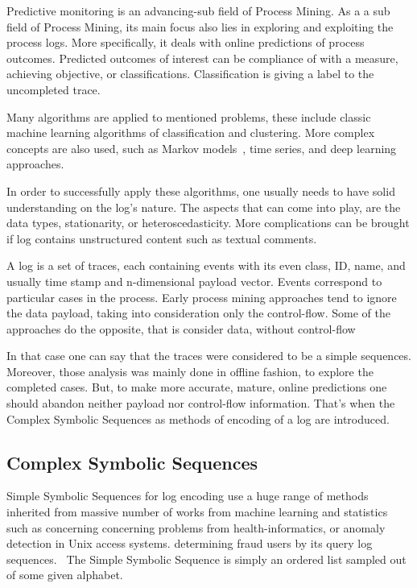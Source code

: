 Predictive monitoring is an advancing-sub field of Process Mining. As a a sub field of Process Mining, its main focus also lies in exploring and exploiting the process logs. More specifically, it deals with online predictions of process outcomes. Predicted outcomes of interest can be compliance of with a measure, achieving objective, or classifications. Classification is giving a label to the uncompleted trace.  
\par
Many algorithms are applied to mentioned problems, these include classic machine learning algorithms of classification and clustering. More complex concepts are also used, such as Markov models~\cite{Leontjeva2015}, time series, and deep learning\cite{niek96732,evermann,quteprints96732} approaches. 
\par
In order to successfully apply these algorithms, one usually needs to have solid understanding on the log's nature. The aspects that can come into play, are the data types, stationarity, or heteroscedasticity. More complications can be brought if log contains unstructured content such as textual comments.
\par
A log is a set of traces, each containing events with its even class, ID, name, and usually time stamp and n-dimensional payload vector. Events correspond to particular cases in the process. Early process mining approaches tend to ignore the data payload, taking into consideration only the control-flow. Some of the approaches do the opposite, that is consider data, without control-flow~\cite{vanderAalst2010,Schonenberg_timeprediction,Schonenberg2008}  
\par
In that case one can say that the traces were considered to be a simple sequences. Moreover, those analysis was mainly done in offline fashion, to explore the completed cases. But, to make more accurate, mature, online predictions one should abandon neither payload nor control-flow information. That's when the Complex Symbolic Sequences as methods of encoding of a log are introduced. 



\subsection{Complex Symbolic Sequences}

Simple Symbolic Sequences for log encoding use a huge range of methods inherited from massive number of works from machine learning and statistics such as concerning concerning problems from health-informatics, or anomaly detection in Unix access systems. determining fraud users by its query log sequences.~\cite{Xing:2010:BSS:1882471.1882478} The Simple Symbolic Sequence is simply an ordered list sampled out of some given alphabet. 

